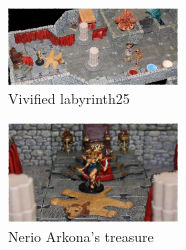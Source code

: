 \begin{figure}[h]
	\centering
	\includegraphics[width=0.4\textwidth]{images/Vivified-labyrinth25-565301156_mod.jpg}
	\caption{Vivified labyrinth25}
	\label{fig:Vivified-labyrinth25-565301156}
\end{figure}

\begin{figure}[h]
	\centering
	\includegraphics[width=0.4\textwidth]{images/Nerio-Arkona-s-treasure-565301563_mod.jpg}
	\caption{Nerio Arkona's treasure}
	\label{fig:Nerio-Arkona-s-treasure-565301563}
\end{figure}

